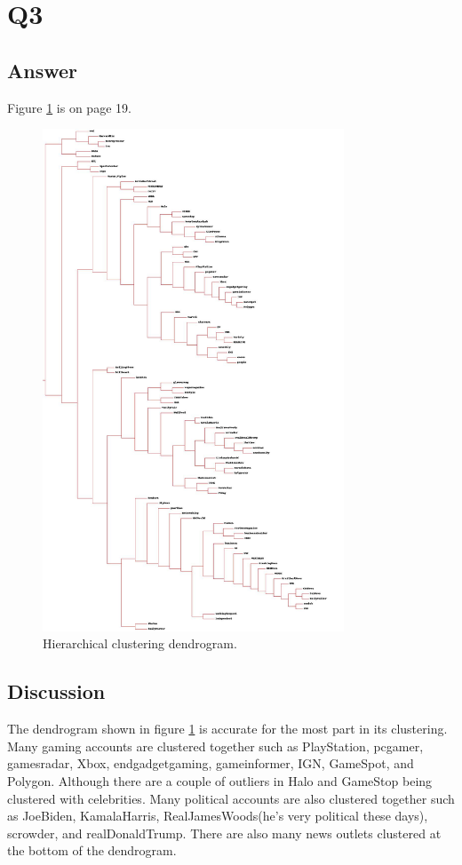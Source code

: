 \documentclass[12pt]{article}
\begin{document}
\section*{Q3}

\subsection*{Answer}
Figure \ref{fig:dendrogram} is on page 19.


\begin{figure}[h]
    \centering
    \includegraphics[trim=0 0 0 0, clip, width=0.8\textwidth] {blogclust.jpg}
    \caption{Hierarchical clustering dendrogram.}
    \label{fig:dendrogram}
\end{figure}


\subsection*{Discussion}
The dendrogram shown in figure \ref{fig:dendrogram} is accurate for the most part in its clustering.  Many gaming accounts are clustered together such as PlayStation, pcgamer, gamesradar, Xbox, endgadgetgaming, gameinformer, IGN, GameSpot, and Polygon.  Although there are a couple of outliers in Halo and GameStop being clustered with celebrities.  Many political accounts are also clustered together such as JoeBiden, KamalaHarris, RealJamesWoods(he's very political these days), scrowder, and realDonaldTrump.  There are also many news outlets clustered at the bottom of the dendrogram.
\end{document}

